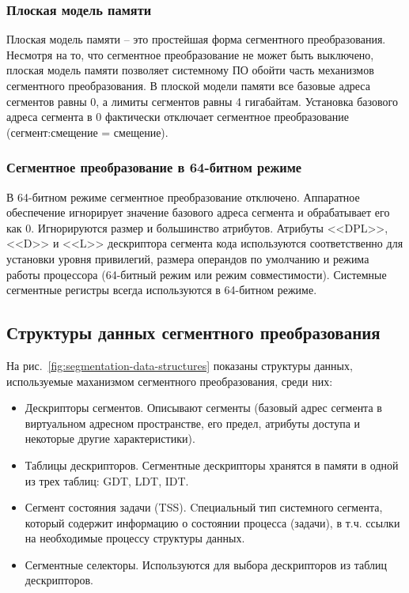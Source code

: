 \subsubsection*{Плоская модель памяти}
Плоская модель памяти -- это простейшая форма сегментного преобразования. Несмотря на то, что сегментное преобразование
не может быть выключено, плоская модель памяти позволяет системному ПО обойти часть механизмов сегментного преобразования.
В плоской модели памяти все базовые адреса сегментов равны 0, а лимиты сегментов равны 4 гигабайтам. Установка
базового адреса сегмента в 0 фактически отключает сегментное преобразование (сегмент:смещение = смещение).

\subsubsection*{Сегментное преобразование в 64-битном режиме}
В 64-битном режиме сегментное преобразование отключено. Аппаратное обеспечение игнорирует значение
базового адреса сегмента и обрабатывает его как 0. Игнорируются размер и большинство атрибутов.
Атрибуты <<DPL>>, <<D>> и <<L>> дескриптора сегмента кода используются соответственно для установки
уровня привилегий, размера операндов по умолчанию и режима работы процессора (64-битный режим или режим совместимости).
Системные сегментные регистры всегда используются в 64-битном режиме.

\subsection{Структуры данных сегментного преобразования}
На рис.~\ref{fig:segmentation-data-structures} показаны структуры данных, используемые
маханизмом сегментного преобразования, среди них:
\begin{itemize}
\item Дескрипторы сегментов. Описывают сегменты (базовый адрес сегмента в виртуальном
	адресном пространстве, его предел, атрибуты доступа и некоторые другие характеристики).
\item Таблицы дескрипторов. Сегментные дескрипторы хранятся в памяти в одной из трех таблиц: GDT, LDT, IDT.
\item Сегмент состояния задачи (TSS). Cпециальный тип системного сегмента, который содержит
	информацию о состоянии процесса (задачи), в т.ч. ссылки на необходимые процессу структуры данных.
\item Сегментные селекторы. Используются для выбора дескрипторов из таблиц дескрипторов.
\end{itemize}

